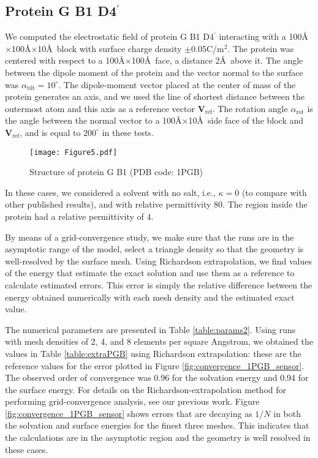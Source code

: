\subsection{Protein G B1 D4$^{\prime}$} \label{sec:PGB}

We computed the electrostatic field of protein G B1 D4$^{\prime}$ interacting with a 100\AA$\times$100\AA$\times$10\AA\ block with surface charge density $\pm$0.05C/m$^2$. The protein was centered with respect to a  100\AA$\times$100\AA\ face, a distance 2\AA\ above it. 
The angle between the dipole moment of the protein and the vector normal to the surface was $\alpha_\text{tilt}=10^\circ$. The dipole-moment vector placed at the center of mass of the protein generates an axis, and we used the line of shortest distance between the outermost atom and this axis as a reference vector $\mathbf{V}_{\text{ref}}$. The rotation angle $\alpha_{\text{rot}}$ is the angle between the normal vector to a 100\AA$\times$10\AA\ side face of the block and $\mathbf{V}_{\text{ref}}$, and is equal to $200^\circ$ in these tests.

\begin{figure}[h] %
   \centering
   \texttt{[image: Figure5.pdf]} 
   \caption{Structure of protein G B1 (PDB code: 1PGB)}
   \label{fig:1PGB}
\end{figure}

In these cases, we considered a solvent with no salt, i.e., $\kappa=0$ (to compare with other published results), and with relative permittivity 80. The region inside the protein had a relative permittivity of 4.

By means of a grid-convergence study, we make sure that the runs are in the asymptotic range of the model, select a triangle density so that the geometry is well-resolved by the surface mesh. Using Richardson extrapolation, we find values of the energy that estimate the exact solution and use them as a reference to calculate estimated errors. This error is simply the relative difference between the energy obtained numerically with each mesh density and the estimated exact value. 

The numerical parameters are presented in Table \ref{table:params2}. Using runs with mesh densities of 2, 4, and 8 elements per square Angstrom, we obtained the values in Table \ref{table:extraPGB} using Richardson extrapolation: these are the reference values for the error plotted in Figure \ref{fig:convergence_1PGB_sensor}. The observed order of convergence was 0.96 for the solvation energy and 0.94 for the surface energy. For details on the Richardson-extrapolation method for performing grid-convergence analysis, see our previous work.\cite{CooperBardhanBarba2013} 
Figure \ref{fig:convergence_1PGB_sensor} shows errors that are decaying as $1/N$ in both the solvation and surface energies for the finest three meshes. This indicates that the calculations are in the asymptotic region and the geometry is well resolved in these cases.

